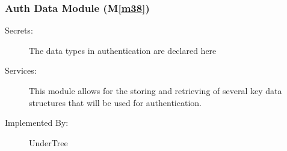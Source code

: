\documentclass[12pt, titlepage]{article}
\newcommand{\mref}[1]{M\ref{#1}}
\begin{document}
	\subsubsection{Auth Data Module (\mref{m38})}
	
	\begin{description}
		\item[Secrets:] The data types in authentication are declared here
		\item[Services:] This module allows for the storing and retrieving of several key data structures that will be used for authentication.
		\item[Implemented By:] UnderTree
	\end{description}
	
	
	
	
	
	
	
\end{document}
